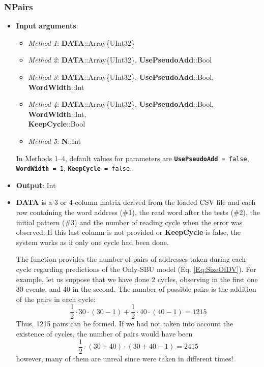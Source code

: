 \subsubsection*{NPairs}\label{Func:Npairs}
\begin{itemize}
	\item \textbf{Input arguments}:
	\begin{itemize}
		\item \textit{Method 1}: \textbf{DATA}::Array\{UInt32\}
		\item \textit{Method 2}: \textbf{DATA}::Array\{UInt32\}, \textbf{UsePseudoAdd}::Bool
		\item \textit{Method 3}: \textbf{DATA}::Array\{UInt32\}, \textbf{UsePseudoAdd}::Bool, \textbf{WordWidth}::Int
		\item \textit{Method 4}: \textbf{DATA}::Array\{UInt32\}, \textbf{UsePseudoAdd}::Bool, \textbf{WordWidth}::Int, \\ \textbf{KeepCycle}::Bool
		\item \textit{Method 5}: \textbf{N}::Int
	\end{itemize}

	In Methods 1--4, default values for parameters are \texttt{\textbf{UsePseudoAdd} = false}, \texttt{\textbf{WordWidth} = 1}, \texttt{\textbf{KeepCycle} = false}. 
	
	\item \textbf{Output}: Int 
	\item \textbf{DATA} is a 3 or 4-column matrix derived from the loaded CSV file and each row containing the word address (\#1), the read word after the tests (\#2), the initial pattern (\#3) and the number of reading cycle when the error was observed. If this last column is not provided or \textbf{KeepCycle} is false, the system works as if only one cycle had been done. 
	
	The function provides the number of pairs of addresses taken during each cycle regarding predictions of the Only-SBU model (Eq. \ref{Eq:SizeOfDV}). For example, let us suppose that we have done 2 cycles, observing in the first one 30 events, and 40 in the second. The number of possible pairs is the addition of the pairs in each cycle:
	\[
	\frac{1}{2}\cdot 30\cdot(30-1)+\frac{1}{2}\cdot 40\cdot(40-1) = 1215
	\]
	Thus, 1215 pairs can be formed. If we had not taken into account the existence of cycles, the number of pairs would have been\[	\frac{1}{2}\cdot (30+40)\cdot(30+40-1) = 2415\]
	however, many of them are unreal since were taken in different times!
	

\end{itemize}
